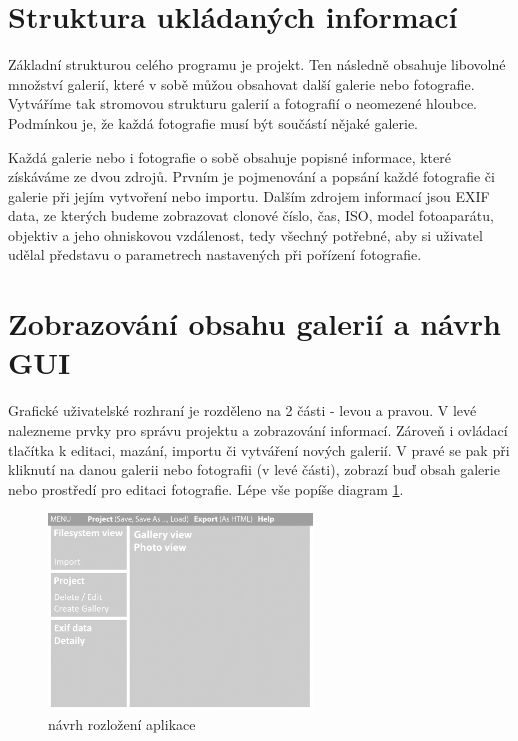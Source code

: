 \documentclass[11pt,twoside,a4paper]{book}
\begin{document}
\section{Struktura ukládaných informací}
\noindent
Základní strukturou celého programu je projekt. Ten následně obsahuje libovolné množství galerií, které v sobě můžou obsahovat další galerie nebo fotografie. Vytváříme tak stromovou strukturu galerií a fotografií o neomezené hloubce. Podmínkou je, že každá fotografie musí být součástí nějaké galerie.

\indent
Každá galerie nebo i fotografie o sobě obsahuje popisné informace, které získáváme ze dvou zdrojů. Prvním je pojmenování a popsání každé fotografie či galerie při jejím vytvoření nebo importu. Dalším zdrojem informací jsou EXIF data, ze kterých budeme zobrazovat clonové číslo, čas, ISO, model fotoaparátu, objektiv a jeho ohniskovou vzdálenost, tedy všechný potřebné, aby si uživatel udělal představu o parametrech nastavených při pořízení fotografie.

\section{Zobrazování obsahu galerií a návrh GUI}
\noindent
Grafické uživatelské rozhraní je rozděleno na 2 části - levou a pravou. V levé nalezneme prvky pro správu projektu a zobrazování informací. Zároveň i  ovládací tlačítka k editaci, mazání, importu či vytváření nových galerií. V pravé se pak při kliknutí na danou galerii nebo fotografii (v levé části), zobrazí buď obsah galerie nebo prostředí pro editaci fotografie. Lépe vše popíše diagram \ref{fig:layout}.

\begin{figure}[ht]
\begin{center}
\includegraphics[width=7cm]{figures/layout}
\caption{návrh rozložení aplikace}
\label{fig:layout}
\end{center}
\end{figure}
\end{document}

